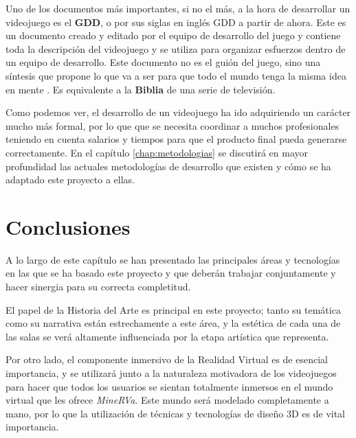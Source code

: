 Uno de los documentos más importantes, si no el más, a la hora de desarrollar un videojuego es el \textbf{\acl{GDD}}, o por sus siglas en inglés \acs{GDD} a partir de ahora. Este es un documento creado y editado por el equipo de desarrollo  del juego y contiene toda la descripción del videojuego y se utiliza para organizar esfuerzos dentro de un equipo de desarrollo. Este documento no es el guión del juego, sino una síntesis que propone lo que va a ser para que todo el mundo tenga la misma idea en mente \cite{bet-03}. Es equivalente a la \textbf{Biblia} de una serie de televisión. 

Como podemos ver, el desarrollo de un videojuego ha ido adquiriendo un carácter mucho más formal, por lo que que se necesita coordinar a muchos profesionales teniendo en cuenta salarios y tiempos para que el producto final pueda generarse correctamente. En el capítulo \ref{chap:metodologias} se discutirá en mayor profundidad las actuales metodologías de desarrollo que existen y cómo se ha adaptado este proyecto a ellas.

\section{Conclusiones}

A lo largo de este capítulo se han presentado las principales áreas y tecnologías en las que se ha basado este proyecto y que deberán trabajar conjuntamente y hacer sinergia para su correcta completitud.

El papel de la Historia del Arte es principal en este proyecto; tanto su temática como su narrativa están estrechamente a este área, y la estética de cada una de las salas se verá altamente influenciada por la etapa artística que representa.

Por otro lado, el componente inmersivo de la Realidad Virtual es de esencial importancia, y se utilizará junto a la naturaleza motivadora de los videojuegos para hacer que todos los usuarios se sientan totalmente inmersos en el mundo virtual que les ofrece \textit{MineRVa}. Este mundo será modelado completamente a mano, por lo que la  utilización de técnicas y tecnologías de diseño 3D es de vital importancia.